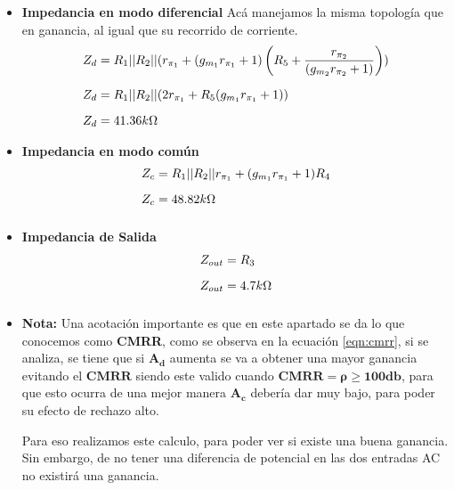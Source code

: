 \begin{enumerate}
        \begin{itemize}
          \item \textbf{Impedancia en modo diferencial}
                Acá manejamos la misma topología que en ganancia, al igual que su recorrido de corriente.
                \begin{align}
                  Z_d   & = R_{1}||R_{2}||(r_{\pi_1}+ (g_{m_1}r_{\pi_1}+1)
                  \left(R_{5}+\dfrac{r_{\pi_2}}{(g_{m_2}r_{\pi_2}+1)}\right)) \nonumber \\[0.2cm]
                  Z_d   & = R_{1}||R_{2}||(2r_{\pi_1}+
                  R_{5}(g_{m_1}r_{\pi_1}+1))\nonumber                                   \\[0.2cm]
                  Z_{d} & = 41.36k\ohm \label{eqn:zd}
                \end{align}

          \item \textbf{Impedancia en modo común}
                \begin{align*}
                  Z_c & =R_1||R_2||r_{\pi_1}+(g_{m_1}r_{\pi_1}+1)R_{4} \\[0.2cm]
                  Z_c & =48.82k \ohm                                   \\[0.2cm]
                \end{align*}

          \item \textbf{Impedancia de Salida}
                \begin{align*}
                  Z_{out} & =R_3       \\[0.2cm]
                  Z_{out} & =4.7k \ohm \\[0.2cm]
                \end{align*}


          \item \textbf{Nota:} Una acotación importante es que en este apartado se da lo que conocemos como \textbf{CMRR}, como se observa en la ecuación \ref{eqn:cmrr}, si se analiza, se tiene que si $\mathbf{A_d}$ aumenta se va a obtener una mayor ganancia evitando el $\mathbf{CMRR}$ siendo este valido cuando $\mathbf{CMRR=\rho \geq 100db}$, para que esto ocurra de una mejor manera $\mathbf{A_c}$ debería dar muy bajo, para poder su efecto de rechazo alto.

                Para eso realizamos este calculo, para poder ver si existe una buena ganancia. Sin embargo, de no tener una diferencia de potencial en las dos entradas AC no existirá una ganancia.
        \end{itemize}


\end{enumerate}
